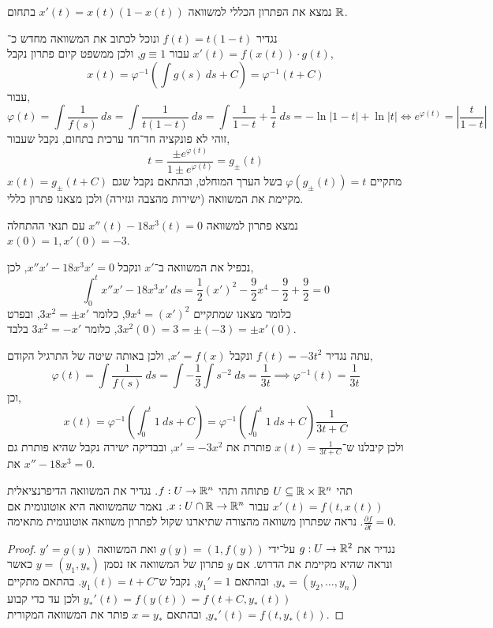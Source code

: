 \question{}
נמצא את הפתרון הכללי למשוואה $x'(t) = x(t) (1 - x(t))$ בתחום $\mathbb{R}$.
\begin{solution}
	נגדיר $f(t) = t(1 - t)$ ונוכל לכתוב את המשוואה מחדש כ־$x'(t) = f(x(t)) \cdot g(t)$ עבור $g \equiv 1$, ולכן ממשפט קיום פתרון נקבל,
	\[
		x(t)
		= \varphi^{-1}(\int g(s)\ ds + C)
		= \varphi^{-1}(t + C)
	\]
	עבור,
	\[
		\varphi(t)
		= \int \frac{1}{f(s)}\ ds
		= \int \frac{1}{t(1 - t)}\ ds
		= \int \frac{1}{1 - t} + \frac{1}{t}\ ds
		= -\ln|1 - t| + \ln|t|
		\iff e^{\varphi(t)} = \left\lvert \frac{t}{1 - t} \right\rvert
	\]
	זוהי לא פונקציה חד־חד ערכית בתחום, נקבל שעבור,
	\[
		t = \frac{\pm e^{\varphi(t)}}{1 \pm e^{\varphi(t)}} = g_{\pm}(t)
	\]
	מתקיים $\varphi(g_{\pm}(t)) = t$ בשל הערך המוחלט, ובהתאם נקבל שגם $x(t) = g_{\pm}(t + C)$ מקיימת את המשוואה (ישירות מהצבה וגזירה) ולכן מצאנו פתרון כללי.
\end{solution}

\question{}
נמצא פתרון למשוואה $x''(t) - 18 x^3(t) = 0$ עם תנאי ההתחלה $x(0) = 1, x'(0) = -3$.
\begin{solution}
	נכפיל את המשוואה ב־$x'$ ונקבל $x'' x' - 18 x^3 x' = 0$, לכן,
	\[
		\int_0^t x'' x' - 18 x^3 x'\ ds
		= \frac{1}{2} {(x')}^2 - \frac{9}{2} x^4 - \frac{9}{2} + \frac{9}{2}
		= 0
	\]
	כלומר מצאנו שמתקיים $9 x^4 = {(x')}^2$, כלומר $3 x^2 = \pm x'$, ובפרט $3 x^2(0) = 3 = \pm (-3) = \pm x'(0)$, כלומר $3 x^2 = - x'$ בלבד.

	עתה נגדיר $f(t) = -3 t^2$ ונקבל $x' = f(x)$, ולכן באותה שיטה של התרגיל הקודם,
	\[
		\varphi(t)
		= \int \frac{1}{f(s)}\ ds
		= \int -\frac{1}{3} \int s^{-2}\ ds
		= \frac{1}{3 t}
		\implies \varphi^{-1}(t) = \frac{1}{3 t}
	\]
	וכן,
	\[
		x(t)
		= \varphi^{-1}(\int_0^t 1\ ds + C)
		= \varphi^{-1}(\int_0^t 1\ ds + C)
		\frac{1}{3t + C}
	\]
	ולכן קיבלנו ש־$x(t) = \frac{1}{3t + C}$ פותרת את $x' = -3 x^2$, ובבדיקה ישירה נקבל שהיא פותרת גם את $x'' - 18 x^3 = 0$.
\end{solution}

\question{}
תהי $U \subseteq \mathbb{R} \times \mathbb{R}^n$ פתוחה ותהי $f : U \to \mathbb{R}^n$.
נגדיר את המשוואה הדיפרנציאלית $x'(t) = f(t, x(t))$ עבור $x : U \cap \mathbb{R} \to \mathbb{R}^n$.
נאמר שהמשוואה היא אוטונומית אם $\frac{\partial f}{\partial t} = 0$.
נראה שפתרון משוואה מהצורה שתיארנו שקול לפתרון משוואה אוטונומית מתאימה.
\begin{proof}
	נגדיר את $g : U \to \mathbb{R}^2$ על־ידי $g(y) = (1, f(y))$ ואת המשוואה $y' = g(y)$ ונראה שהיא מקיימת את הדרוש.
	אם $y$ פתרון של המשוואה אז נסמן $y = (y_1, y_*)$ כאשר $y_* = (y_2, \ldots, y_n)$, ובהתאם $y_1' = 1$, נקבל ש־$y_1(t) = t + C$.
	בהתאם מתקיים $y_*'(t) = f(y(t)) = f(t + C, y_*(t))$ ולכן עד כדי קבוע $y_*'(t) = f(t, y_*(t))$, ובהתאם $x = y_*$ פותר את המשוואה המקורית.
\end{proof}


